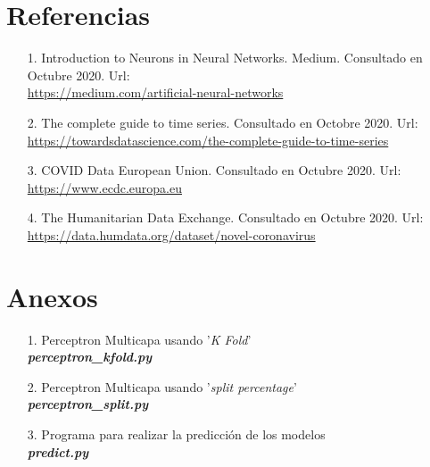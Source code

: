 \documentclass[12pt,a4paper, xcolor=table]{article}
\begin{document}
\section{Referencias}
    \begin{itemize}
        \item [1.] Introduction to Neurons in Neural Networks. Medium. Consultado en Octubre 2020. Url: \\
        \href{https://medium.com/artificial-neural-networks/introduction-to-neurons-in-neural-networks-71828d040a65}{https://medium.com/artificial-neural-networks}
        \item [2.] The complete guide to time series. Consultado en Octobre 2020. Url: \\
        \href{https://towardsdatascience.com/the-complete-guide-to-time-series-analysis-and-forecasting-70d476bfe775}{https://towardsdatascience.com/the-complete-guide-to-time-series}
        \item [3.] COVID Data European Union. Consultado en Octubre 2020. Url: \\
        \href{https://www.ecdc.europa.eu/en/geographical-distribution-2019-ncov-cases}{https://www.ecdc.europa.eu}
        \item [4.] The Humanitarian Data Exchange. Consultado en Octubre 2020. Url: \\
        \href{https://data.humdata.org/dataset/novel-coronavirus-2019-ncov-cases}{https://data.humdata.org/dataset/novel-coronavirus}
    \end{itemize}
\printindex



  \section{Anexos}
  \begin{itemize}
    \item [1.] Perceptron Multicapa usando '\textit{K Fold}'\\
    \textbf{\textit{perceptron\_kfold.py}}
    \item [2.] Perceptron Multicapa usando '\textit{split percentage}'\\
    \textbf{\textit{perceptron\_split.py}}
    \item [3.] Programa para realizar la predicción de los modelos\\
    \textbf{\textit{predict.py}}
  \end{itemize}
\end{document}
